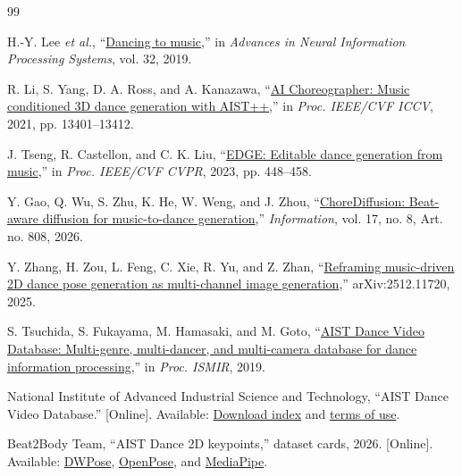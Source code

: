 \documentclass[conference,letterpaper]{IEEEtran}
\begin{document}
\begin{thebibliography}{99}

H.-Y. Lee \emph{et al.}, \textquotedblleft\href{https://proceedings.neurips.cc/paper_files/paper/2019/hash/7ca57a9f85a19a6e4b9a248c1daca185-Abstract.html}{Dancing to music},'' in \emph{Advances in Neural Information Processing Systems}, vol. 32, 2019.

R. Li, S. Yang, D. A. Ross, and A. Kanazawa, \textquotedblleft\href{https://openaccess.thecvf.com/content/ICCV2021/html/Li_AI_Choreographer_Music_Conditioned_3D_Dance_Generation_With_AIST_ICCV_2021_paper.html}{AI Choreographer: Music conditioned 3D dance generation with AIST++},'' in \emph{Proc. IEEE/CVF ICCV}, 2021, pp. 13401--13412.

J. Tseng, R. Castellon, and C. K. Liu, \textquotedblleft\href{https://openaccess.thecvf.com/content/CVPR2023/html/Tseng_EDGE_Editable_Dance_Generation_From_Music_CVPR_2023_paper.html}{EDGE: Editable dance generation from music},'' in \emph{Proc. IEEE/CVF CVPR}, 2023, pp. 448--458.

Y. Gao, Q. Wu, S. Zhu, K. He, W. Weng, and J. Zhou, \textquotedblleft\href{https://doi.org/10.3390/info17080808}{ChoreDiffusion: Beat-aware diffusion for music-to-dance generation},'' \emph{Information}, vol. 17, no. 8, Art. no. 808, 2026.

Y. Zhang, H. Zou, L. Feng, C. Xie, R. Yu, and Z. Zhan, \textquotedblleft\href{https://arxiv.org/abs/2512.11720}{Reframing music-driven 2D dance pose generation as multi-channel image generation},'' arXiv:2512.11720, 2025.

S. Tsuchida, S. Fukayama, M. Hamasaki, and M. Goto, \textquotedblleft\href{https://archives.ismir.net/ismir2019/paper/000060.pdf}{AIST Dance Video Database: Multi-genre, multi-dancer, and multi-camera database for dance information processing},'' in \emph{Proc. ISMIR}, 2019.

National Institute of Advanced Industrial Science and Technology, \textquotedblleft AIST Dance Video Database.'' [Online]. Available: \href{https://aistdancedb.ongaaccel.jp/database_download/}{Download index} and \href{https://aistdancedb.ongaaccel.jp/terms_of_use/}{terms of use}.

Beat2Body Team, \textquotedblleft AIST Dance 2D keypoints,'' dataset cards, 2026. [Online]. Available: \href{https://huggingface.co/datasets/SizheZ03/AISTDance_dwpose}{DWPose}, \href{https://huggingface.co/datasets/SizheZ03/AISTDance_openpose}{OpenPose}, and \href{https://huggingface.co/datasets/SizheZ03/AISTDance_mediapipe}{MediaPipe}.


\end{thebibliography}
\end{document}
